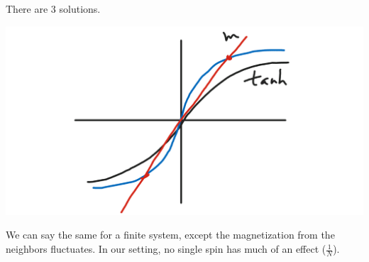 \documentclass[12pt]{book}
\theoremstyle{norm}
\begin{document}
There are 3 solutions.

\begin{center}\includegraphics[scale=.25]{images/4-26-5}\end{center}

We can say the same for a finite system, except the magnetization from the neighbors fluctuates. In our setting, no single spin has much of an effect ($\frac{1}{N}$). 


%

%
%

\printnomenclature
\printindex
\end{document}

